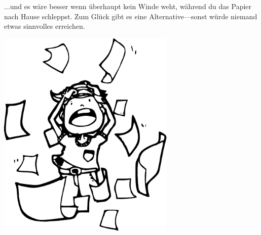 $\ldots$und es wäre besser wenn überhaupt kein Winde weht, während du das Papier nach Hause schleppst. Zum Glück gibt es eine Alternative---sonst würde niemand etwas sinnvolles erreichen.


\begin{center}
\includegraphics*[width=85mm]{images/pullinghair}
\end{center}

